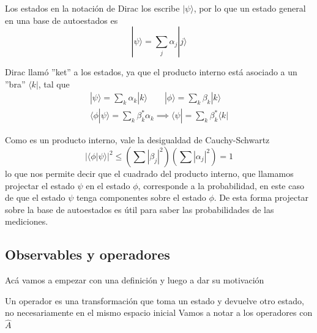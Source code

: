 Los estados en la notación de Dirac los escribe $|\psi\rangle$, por lo que un estado general en una base de autoestados es
\begin{equation}
    |\psi\rangle = \sum_j \alpha_j |j\rangle
\end{equation}

Dirac llamó ''ket'' a los estados, ya que el producto interno está asociado a un ''bra'' $\langle k|$, tal que
\begin{equation}
    \begin{gathered}
    |\psi\rangle = \sum_k \alpha_k |k \rangle \qquad |\phi\rangle = \sum_k \beta_k |k\rangle \\
    \langle \phi | \psi \rangle = \sum_k \beta^*_k \alpha_k \implies \langle \psi | = \sum_k \beta^*_k \langle k|
\end{gathered}
\end{equation}

Como es un producto interno, vale la desigualdad de Cauchy-Schwartz
\begin{equation}
    |\langle \phi | \psi \rangle|^2 \leq (\sum |\beta_j|^2) (\sum |\alpha_j|^2) = 1
\end{equation}
lo que nos permite decir que el cuadrado del producto interno, que llamamos projectar el estado $\psi$ en el estado $\phi$, corresponde a la probabilidad, en este caso de que el estado $\psi$ tenga componentes sobre el estado $\phi$. 
De esta forma projectar sobre la base de autoestados es útil para saber las probabilidades de las mediciones.

\subsection{Observables y operadores}

Acá vamos a empezar con una definición y luego a dar su motivación
\begin{definition}[Operador]
    Un operador es una transformación que toma un estado y devuelve otro estado, no necesariamente en el mismo espacio inicial
    Vamos a notar a los operadores con $\hat{A}$
\end{definition}

